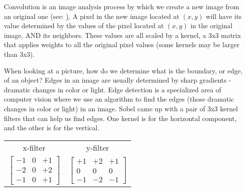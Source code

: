 \documentclass{article}
\begin{document}
\begin{itemize}
          Convolution is an image analysis process by which we create a new image from an original one (see: \href{https://en.wikipedia.org/wiki/Kernel\_(image\_processing)\#Convolution}).  A pixel in the new image located at $(x, y)$ will have its value determined by the values of the pixel located at $(x, y)$ in the original image, AND its neighbors.  These values are all scaled by a kernel, a 3x3 matrix that applies weights to all the original pixel values (some kernels may be larger than 3x3).

          When looking at a picture, how do we determine what is the boundary, or edge, of an object?  Edges in an image are usually determined by sharp gradients - dramatic changes in color or light. Edge detection is a specialized area of computer vision where we use an algorithm to find the edges (those dramatic changes in color or light) in an image. Sobel came up with a pair of 3x3 kernel filters that can help us find edges.  One kernel is for the horizontal component, and the other is for the vertical.

          \begin{center}
              \begin{tabular}{ c c }
                  x-filter & y-filter \\
                  $
                      \begin{bmatrix}
                          -1 & 0 & +1 \\
                          -2 & 0 & +2 \\
                          -1 & 0 & +1
                      \end{bmatrix}
                  $
                           & $
                      \begin{bmatrix}
                          +1 & +2 & +1 \\
                          0  & 0  & 0  \\
                          -1 & -2 & -1
                      \end{bmatrix}
                  $
              \end{tabular}
          \end{center}

          \iffalse
              The x-filter is:

              $
                  \begin{bmatrix}
                      -1 & 0 & +1 \\
                      -2 & 0 & +2 \\
                      -1 & 0 & +1
                  \end{bmatrix}
              $
          \fi


\end{itemize}
\end{document}
